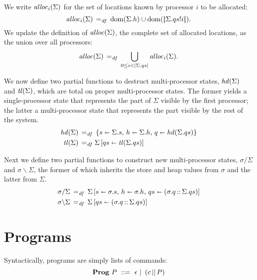 \documentclass[11pt]{report}
\begin{document}
We write $\mathit{alloc}_{i}(\Sigma)$ for the set of locations known by processor $i$ to be allocated: \begin{equation}
	\label{eq:allocat}
	\allocat{i}{\Sigma} \eqdef \dom{\Sigma.h} \cup \dom{\elems{\nth{i}{\Sigma.qs}}}.
\end{equation} We update the definition of $\mathit{alloc}(\Sigma)$, the complete set of allocated locations, as the union over all processors: \begin{equation}
	\label{eq:mpalloc}
	\alloc{\Sigma} \eqdef \bigcup_{0 \leq i < \llen{\Sigma.qs}} \allocat{i}{\Sigma}.  
\end{equation} 

We now define two partial functions to destruct multi-processor states, $\mathit{hd}(\Sigma)$ and $\mathit{tl}(\Sigma)$, which are total on proper multi-processor states. The former yields a single-processor state that represents the part of $\Sigma$ visible by the first processor; the latter a multi-processor state that represents the part visible by the rest of the system. \begin{align}
	\label{eq:mphdtl}
	\lhead{\Sigma} \eqdef & \reclit{\ptup{s}{\Sigma.s},\, \ptup{h}{\Sigma.h},\, \ptup{q}{\lhead{\Sigma.qs}}} \\
	\ltail{\Sigma} \eqdef & \funup{\Sigma}{\ptup{qs}{\ltail{\Sigma.qs}}}
\end{align}

Next we define two partial functions to construct new multi-processor states, $\sigma / \Sigma$ and $\sigma \backslash \Sigma$, the former of which inherits the store and heap values from $\sigma$ and the latter from $\Sigma$. 
\begin{align}
	\sigma / \Sigma \operatorname{\;=_{\mathit{df}}\;} {} & \Sigma \left[ s \shortleftarrow \sigma.s,\,h \shortleftarrow \sigma.h,\,qs \shortleftarrow (\sigma.q \operatorname{:\!:}\Sigma.qs) \right] \\ 
	\sigma \backslash \Sigma \operatorname{\;=_{\mathit{df}}\;} {} & \Sigma \left[ qs \shortleftarrow (\sigma.q \operatorname{:\!:} \Sigma.qs) \right]
\end{align}

\section{Programs} %
\label{sec:programs}

Syntactically, programs are simply lists of commands: 
\begin{equation}
	\label{eq:programs}
	\progs~P \bnfdef \epsilon \bnfbar \left(\cpar{c}{P}\right)
\end{equation}
\end{document}

